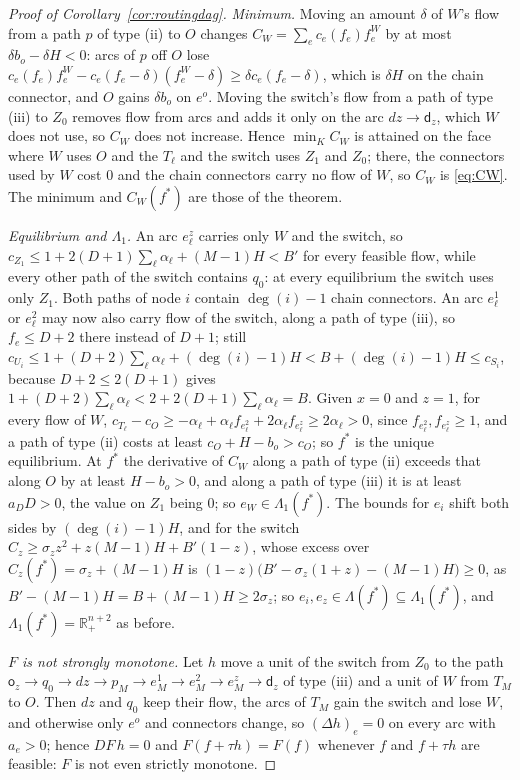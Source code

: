\documentclass[11pt,a4paper]{article}
\theoremstyle{plain}
\theoremstyle{definition}
\theoremstyle{remark}
\newcommand{\R}{\mathbb{R}}
\newcommand{\Lam}{\Lambda}
\newcommand{\Lone}{\Lambda_{1}}
\begin{document}
\begin{proof}[Proof of Corollary~\ref{cor:routingdag}]
\emph{Minimum.} Moving an amount $\delta$ of $W$'s flow from a path $p$ of type (ii) to $O$ changes $C_W=\sum_ec_e(f_e)f^W_e$ by at most $\delta b_o-\delta H<0$: arcs of $p$ off $O$ lose $c_e(f_e)f^W_e-c_e(f_e-\delta)(f^W_e-\delta)\ge\delta c_e(f_e-\delta)$, which is $\delta H$ on the chain connector, and $O$ gains $\delta b_o$ on $e^o$. Moving the switch's flow from a path of type (iii) to $Z_0$ removes flow from arcs and adds it only on the arc $dz\to\mathsf d_z$, which $W$ does not use, so $C_W$ does not increase. Hence $\min_KC_W$ is attained on the face where $W$ uses $O$ and the $T_\ell$ and the switch uses $Z_1$ and $Z_0$; there, the connectors used by $W$ cost $0$ and the chain connectors carry no flow of $W$, so $C_W$ is \eqref{eq:CW}. The minimum and $C_W(f^*)$ are those of the theorem.

\emph{Equilibrium and $\Lone$.} An arc $e^z_\ell$ carries only $W$ and the switch, so $c_{Z_1}\le1+2(D+1)\sum_\ell\alpha_\ell+(M-1)H<B'$ for every feasible flow, while every other path of the switch contains $q_0$: at every equilibrium the switch uses only $Z_1$. Both paths of node $i$ contain $\deg(i)-1$ chain connectors. An arc $e^1_\ell$ or $e^2_\ell$ may now also carry flow of the switch, along a path of type (iii), so $f_e\le D+2$ there instead of $D+1$; still $c_{U_i}\le1+(D+2)\sum_\ell\alpha_\ell+(\deg(i)-1)H<B+(\deg(i)-1)H\le c_{S_i}$, because $D+2\le2(D+1)$ gives $1+(D+2)\sum_\ell\alpha_\ell<2+2(D+1)\sum_\ell\alpha_\ell=B$. Given $x=0$ and $z=1$, for every flow of $W$, $c_{T_\ell}-c_O\ge-\alpha_\ell+\alpha_\ell f_{e^2_\ell}+2\alpha_\ell f_{e^z_\ell}\ge2\alpha_\ell>0$, since $f_{e^2_\ell},f_{e^z_\ell}\ge1$, and a path of type (ii) costs at least $c_O+H-b_o>c_O$; so $f^*$ is the unique equilibrium. At $f^*$ the derivative of $C_W$ along a path of type (ii) exceeds that along $O$ by at least $H-b_o>0$, and along a path of type (iii) it is at least $a_DD>0$, the value on $Z_1$ being $0$; so $e_W\in\Lone(f^*)$. The bounds for $e_i$ shift both sides by $(\deg(i)-1)H$, and for the switch $C_z\ge\sigma_zz^2+z(M-1)H+B'(1-z)$, whose excess over $C_z(f^*)=\sigma_z+(M-1)H$ is $(1-z)\big(B'-\sigma_z(1+z)-(M-1)H\big)\ge0$, as $B'-(M-1)H=B+(M-1)H\ge2\sigma_z$; so $e_i,e_z\in\Lam(f^*)\subseteq\Lone(f^*)$, and $\Lone(f^*)=\R^{n+2}_+$ as before.

\emph{$F$ is not strongly monotone.} Let $h$ move a unit of the switch from $Z_0$ to the path $\mathsf o_z\to q_0\to dz\to p_M\to e^1_M\to e^2_M\to e^z_M\to\mathsf d_z$ of type (iii) and a unit of $W$ from $T_M$ to $O$. Then $dz$ and $q_0$ keep their flow, the arcs of $T_M$ gain the switch and lose $W$, and otherwise only $e^o$ and connectors change, so $(\Delta h)_e=0$ on every arc with $a_e>0$; hence $DF\,h=0$ and $F(f+\tau h)=F(f)$ whenever $f$ and $f+\tau h$ are feasible: $F$ is not even strictly monotone.


\end{proof}
\end{document}

